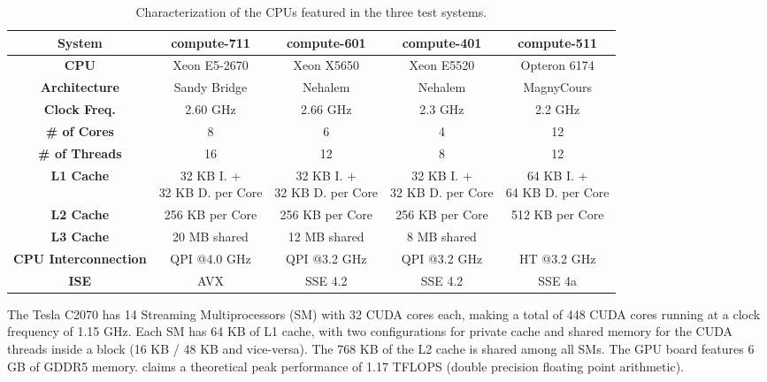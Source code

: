 \begin{footnotesize}
\begin{table}[!htp]
	\begin{center}
	\smaller
		\begin{tabular}{|c|c|c|c|c|}
			\hline
			\textbf{System} & compute-711 & compute-601 & compute-401 & compute-511 \\ \hline
			\textbf{CPU} & \intel Xeon E5-2670 & \intel Xeon X5650 & \intel Xeon E5520 & \amd Opteron 6174 \\ \hline
			\textbf{Architecture} & Sandy Bridge & Nehalem & Nehalem & Magny\-Cours \\ \hline
			\textbf{Clock Freq.} & 2.60 GHz & 2.66 GHz & 2.3 GHz & 2.2 GHz \\ \hline
			\textbf{\# of Cores} & 8 & 6 & 4 & 12 \\ \hline
			\textbf{\# of Threads} & 16 & 12 & 8 & 12 \\ \hline
			\textbf{L1 Cache} & \specialcell{32 KB I. +\\32 KB D. per Core} & \specialcell{32 KB I. +\\32 KB D. per Core} & \specialcell{32 KB I. +\\32 KB D. per Core} & \specialcell{64 KB I. +\\64 KB D. per Core} \\ \hline
			\textbf{L2 Cache} & 256 KB per Core & 256 KB per Core & 256 KB per Core & 512 KB per Core \\ \hline
			\textbf{L3 Cache} & 20 MB shared & 12 MB shared & 8 MB shared & \- \\ \hline
			\textbf{CPU Interconnection} & QPI @4.0 GHz & QPI @3.2 GHz & QPI @3.2 GHz & HT @3.2 GHz \\ \hline
			\textbf{ISE} & AVX & SSE 4.2 & SSE 4.2 & SSE 4a \\
			\hline
		\end{tabular}
		\caption{Characterization of the CPUs featured in the three test systems.}
		\label{tab:CPUS}
	\end{center}
\end{table}
\end{footnotesize}

The \nvidia Tesla C2070 has 14 Streaming Multiprocessors (SM) with 32 CUDA cores each, making a total of 448 CUDA cores running at a clock frequency of 1.15 GHz. Each SM has 64 KB of L1 cache, with two configurations for private cache and shared memory for the CUDA threads inside a block (16 KB / 48 KB and vice-versa). The 768 KB of the L2 cache is shared among all SMs. The GPU board features 6 GB of GDDR5 memory. \nvidia claims a theoretical peak performance of 1.17 TFLOPS (double precision floating point arithmetic).

